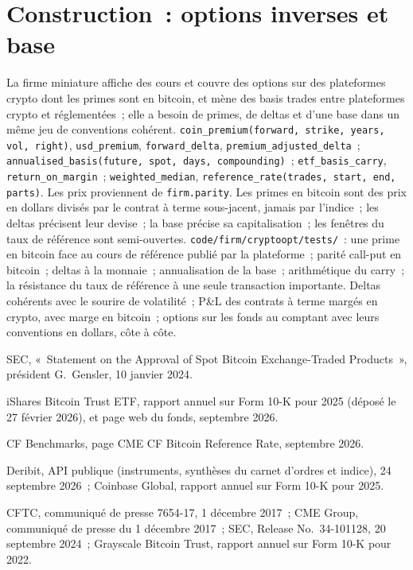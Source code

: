 \section{Construction~: options inverses et base}\label{bld:m3:dated-futures-options-and-etfs:cryptoopt}

\begin{build}
 La firme miniature affiche des cours et couvre des options sur des plateformes crypto dont les primes sont en bitcoin, et mène des basis trades entre
plateformes crypto et réglementées~; elle a besoin de primes, de deltas et d'une base dans un même jeu de conventions cohérent.
 \texttt{coin\_premium(forward, strike, years, vol, right)}, \texttt{usd\_premium}, \texttt{forward\_delta},
\texttt{premium\_adjusted\_delta}~; \texttt{annualised\_basis(future, spot, days, compounding)}~; \texttt{etf\_basis\_carry},
\texttt{return\_on\_margin}~; \texttt{weighted\_median}, \texttt{reference\_rate(trades, start, end, parts)}. Les prix proviennent de
\texttt{firm.parity}.
 Les primes en bitcoin sont des prix en dollars divisés par le contrat à terme sous-jacent, jamais par l'indice~; les deltas précisent leur devise~;
la base précise sa capitalisation~; les fenêtres du taux de référence sont semi-ouvertes.
 \texttt{code/firm/cryptoopt/tests/}~: une prime en bitcoin face au cours de référence publié par la plateforme~; parité call-put en bitcoin~; deltas à
la monnaie~; annualisation de la base~; arithmétique du carry~; la résistance du taux de référence à une seule transaction importante.
 Deltas cohérents avec le sourire de volatilité~; P\&L des contrats à terme margés en crypto, avec marge en bitcoin~; options sur les fonds au comptant avec leurs
conventions en dollars, côte à côte.
\end{build}

\begin{omsources}
\item SEC, «~Statement on the Approval of Spot Bitcoin Exchange-Traded Products~», président G.~Gensler, 10 janvier 2024.
\item iShares Bitcoin Trust ETF, rapport annuel sur Form 10-K pour 2025 (déposé le 27 février 2026), et page web du fonds, septembre 2026.
\item CF Benchmarks, page CME CF Bitcoin Reference Rate, septembre 2026.
\item Deribit, API publique (instruments, synthèses du carnet d'ordres et indice), 24 septembre 2026~; Coinbase Global, rapport annuel sur Form 10-K pour 2025.
\item CFTC, communiqué de presse 7654-17, 1 décembre 2017~; CME Group, communiqué de presse du 1 décembre 2017~; SEC, Release No.\ 34-101128, 20 septembre 2024~;
Grayscale Bitcoin Trust, rapport annuel sur Form 10-K pour 2022.
\end{omsources}

